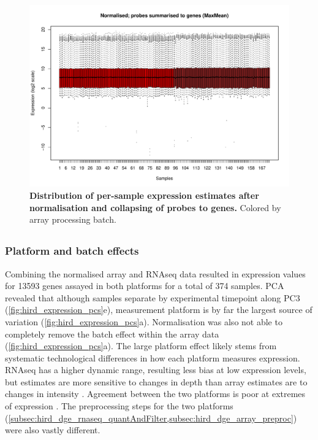 \begin{figure}
    \centering
    \includegraphics[width=1.0\textwidth]{mainmatter/figures/chapter_02/array_data_setup.array_intensity_boxplots.MaxMean.pdf}
    \caption{
        \textbf{Distribution of per-sample expression estimates after normalisation and collapsing of probes to genes.}
        Colored by array processing batch.
    }
    \label{fig:hird_array_boxplots_MaxMean}
\end{figure}

\subsection{}

\subsubsection{Platform and batch effects}
\label{subsubsec:hird_dge_platform_and_batch_effects}

Combining the normalised array and \gls{RNAseq} data resulted in expression values for \num{13593} genes assayed in both platforms for a total of 374 samples.
\gls{PCA} revealed that although samples separate by experimental timepoint along \gls{PC}3 (\cref{fig:hird_expression_pcs}e), 
measurement platform is by far the largest source of variation (\cref{fig:hird_expression_pcs}a).
Normalisation was also not able to completely remove the batch effect within the array data (\cref{fig:hird_expression_pcs}a).
The large platform effect likely stems from systematic technological differences in how each platform measures expression.
\gls{RNAseq} has a higher dynamic range, resulting less bias at low expression levels, but estimates are more sensitive to changes in depth than array estimates are to changes in intensity \autocite{robinson2015NestedParallelExperiment}.
Agreement between the two platforms is poor at extremes of expression \autocite{wang2009RNASeqRevolutionaryTool,ma2017JointBayesianModel}.
The preprocessing steps for the two platforms (\cref{subsec:hird_dge_rnaseq_quantAndFilter,subsec:hird_dge_array_preproc}) were also vastly different.


